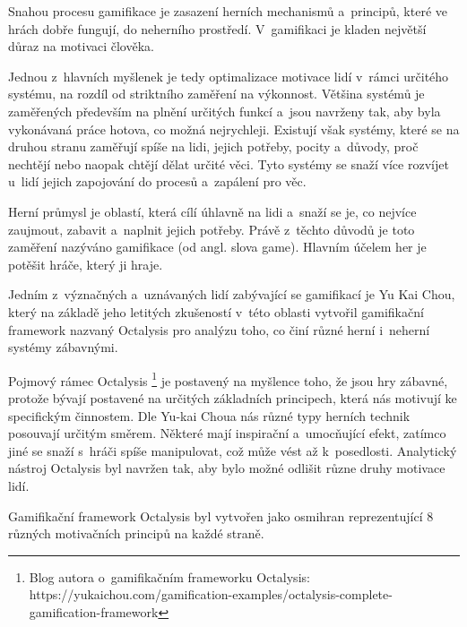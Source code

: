 \documentclass[12pt]{article}
\begin{document}

Snahou procesu gamifikace je zasazení herních mechanismů a~principů,
které ve hrách dobře fungují, do neherního prostředí.
V~gamifikaci je kladen největší důraz na motivaci člověka.

Jednou z~hlavních myšlenek je tedy optimalizace motivace lidí
v~rámci určitého systému, na rozdíl od striktního zaměření na výkonnost.
Většina systémů je zaměřených především na plnění určitých funkcí 
a~jsou navrženy tak, aby byla vykonávaná práce hotova, co možná nejrychleji.
Existují však systémy, které se na druhou stranu zaměřují spíše na lidi,
jejich potřeby, pocity a~důvody, proč nechtějí nebo naopak chtějí dělat určité věci.
Tyto systémy se snaží více rozvíjet u~lidí jejich zapojování do procesů 
a~zapálení pro věc.

Herní průmysl je oblastí, která cílí úhlavně na lidi a~snaží se je,
co nejvíce zaujmout, zabavit a~naplnit jejich potřeby.
Právě z~těchto důvodů je toto zaměření nazýváno gamifikace (od angl. slova game). 
Hlavním účelem her je potěšit hráče, který ji hraje. \cite{octalysis}


Jedním z~význačných a~uznávaných lidí zabývající se gamifikací je Yu Kai Chou,
který na základě jeho letitých zkušeností v~této oblasti vytvořil gamifikační
framework nazvaný Octalysis pro analýzu toho, co činí různé herní i~neherní systémy
zábavnými.

Pojmový rámec Octalysis
\footnote{Blog autora o~gamifikačním frameworku Octalysis: https://yukaichou.com/gamification-examples/octalysis-complete-gamification-framework}
je postavený na myšlence toho,
že jsou hry zábavné, protože bývají postavené na určitých základních principech,
která nás motivují ke specifickým činnostem.
Dle Yu-kai Choua nás různé typy herních technik posouvají určitým směrem.
Některé mají inspirační a~umocňující efekt,
zatímco jiné se snaží s~hráči spíše manipulovat,
což může vést až k~posedlosti.
Analytický nástroj Octalysis byl navržen tak,
aby bylo možné odlišit různe druhy motivace lidí.

\clearpage

Gamifikační framework Octalysis byl vytvořen jako osmihran reprezentující
8 různých motivačních principů na každé straně.

\obrazek
{}
\end{document}
